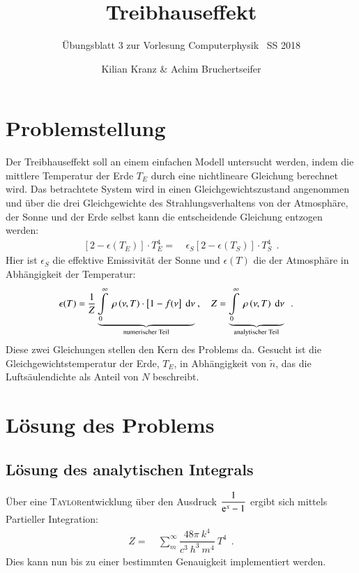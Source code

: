 \documentclass[12pt,a4paper,titlepage]{scrreprt}
\author{Kilian Kranz \& Achim Bruchertseifer}
\title{Treibhauseffekt}
\subtitle{Übungsblatt 3 zur Vorlesung \glqq Computerphysik\grqq~ SS 2018}
\begin{document}
	\maketitle
	\setcounter{chapter}{3}

	\section{Problemstellung}
	Der Treibhauseffekt soll an einem einfachen Modell untersucht werden, indem die mittlere Temperatur der Erde $T_E$ durch eine nichtlineare Gleichung berechnet wird. Das betrachtete System wird in einen Gleichgewichtszustand angenommen und über die drei Gleichgewichte des Strahlungsverhaltens von der Atmosphäre, der Sonne und der Erde selbst kann die entscheidende Gleichung entzogen werden:
	\begin{align}
		\left[2-\epsilon\left(T_E\right)\right]\cdot T_E^4=&~\epsilon_S\left[2-\epsilon\left(T_S\right)\right]\cdot T_S^4~~.	\label{31}
	\end{align}
	Hier ist $\epsilon_S$ die effektive Emissivität der Sonne und $\epsilon\left(T\right)$ die der Atmosphäre in Abhängigkeit der Temperatur:
	\begin{align}
	\epsilon(T)=&~\dfrac{1}{Z}\underbrace{\int\limits_0^\infty~\rho\left(\nu,T\right)\cdot\left[1-f(\nu\right]~\dif\nu}_{\text{numerischer Teil}}~,~~~~Z=\underbrace{\int\limits_0^\infty~\rho\left(\nu,T\right)~\dif\nu}_{\text{analytischer Teil}}~~.
	\end{align}
	Diese zwei Gleichungen stellen den Kern des Problems da. Gesucht ist die Gleichgewichtstemperatur der Erde, $T_E$, in Abhängigkeit von $\tilde{n}$, das die Luftsäulendichte als Anteil von $N$ beschreibt.	
	
	\section{Lösung des Problems}
	\subsection{Lösung des analytischen Integrals}
	Über eine \textsc{Taylor}entwicklung über den Ausdruck $\dfrac{1}{\mathrm{e}^x-1}$ ergibt sich mittels Partieller Integration:
	\begin{align}
		Z=&~\sum_{m}^{\infty}\dfrac{48\pi~k^4}{c^3~h^3~m^4}~T^4~~.
	\end{align}
	Dies kann nun bis zu einer bestimmten Genauigkeit implementiert werden.
	
\end{document}
